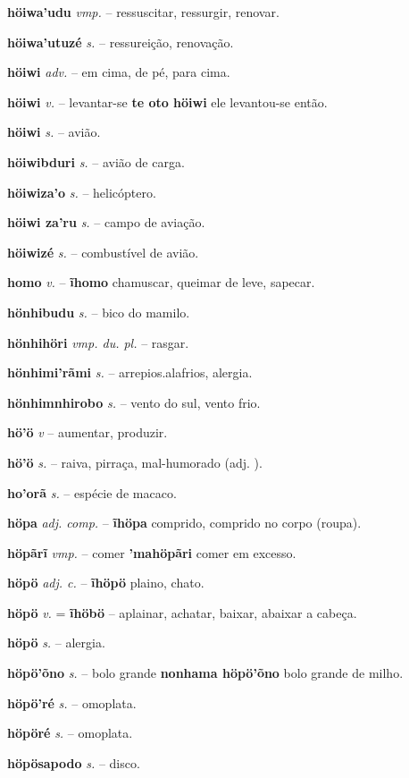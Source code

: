 \textbf{höiwa'udu} \textit{vmp.} -- ressuscitar, ressurgir, renovar.

\textbf{höiwa'utuzé} \textit{s.} -- ressureição, renovação.

\textbf{höiwi} \textit{adv.} -- em cima, de pé, para cima.

\textbf{höiwi} \textit{v.} -- levantar-se  \textbf{te oto höiwi} ele levantou-se então.

\textbf{höiwi} \textit{s.} -- avião.

\textbf{höiwibduri} \textit{s.} -- avião de carga.

\textbf{höiwiza'o} \textit{s.} -- helicóptero.

\textbf{höiwi za'ru} \textit{s.} -- campo de aviação.

\textbf{höiwizé} \textit{s.} -- combustível de avião.

\textbf{homo} \textit{v.} -- \textbf{ĩhomo} chamuscar, queimar de leve, sapecar.

\textbf{hönhibudu} \textit{s.} -- bico do mamilo.

\textbf{hönhihöri} \textit{vmp. du. pl.} -- rasgar.

\textbf{hönhimi'rãmi} \textit{s.} -- arrepios.alafrios, alergia.

\textbf{hönhimnhirobo} \textit{s.} -- vento do sul, vento frio.

\textbf{hö'ö} \textit{v} -- aumentar, produzir.

\textbf{hö'ö} \textit{s.} -- raiva, pirraça, mal-humorado (adj. ).

\textbf{ho'orã} \textit{s.} -- espécie de macaco.

\textbf{höpa} \textit{adj. comp.} -- \textbf{ĩhöpa} comprido, comprido no corpo (roupa).

\textbf{höpãrĩ} \textit{vmp.} -- comer  \textbf{'mahöpãri} comer em excesso.

\textbf{höpö} \textit{adj. c.} -- \textbf{ĩhöpö} plaino, chato.

\textbf{höpö} \textit{v.} = \textbf{ĩhöbö} -- aplainar, achatar, baixar, abaixar a cabeça.

\textbf{höpö} \textit{s.} -- alergia.

\textbf{höpö'õno} \textit{s.} -- bolo grande  \textbf{nonhama höpö'õno} bolo grande de milho.

\textbf{höpö'ré} \textit{s.} -- omoplata.

\textbf{höpöré} \textit{s.} -- omoplata.

\textbf{höpösapodo} \textit{s.} -- disco.

